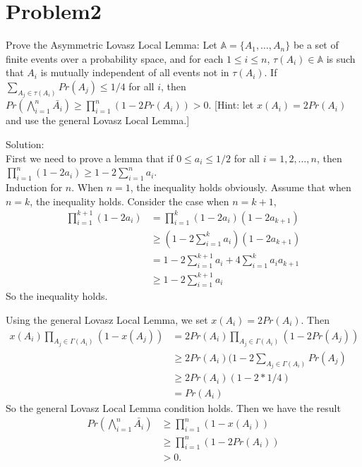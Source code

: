\documentclass[12pt]{article}
\begin{document}
\section{Problem2}
Prove the Asymmetric Lovasz Local Lemma: Let $\mathbb{A} = \{A_1, \dots, A_n\}$ be a set of finite events over a probability space, and for each $1 \le i \le n$, $\tau(A_i) \in \mathbb{A}$ is such that $A_i$ is mutually independent of all events not in $\tau(A_i)$. If $\sum_{A_j \in \tau(A_i)} Pr(A_j) \le 1/4 $ for all $i$, then $ Pr(\bigwedge_{i=1}^n \bar{A_i}) \ge \prod_{i=1}^n (1 - 2Pr(A_i))> 0$. [Hint: let $x(A_i) = 2Pr(A_i)$ and use the general Lovasz Local Lemma.]

Solution:\\
First we need to prove a lemma that if $0\le a_i \le 1/2$ for all $i=1,2,\dots,n$, then $\prod_{i=1}^n (1-2a_i) \ge 1-2\sum_{i=1}^n a_i$.\\
Induction for $n$. When $n=1$, the inequality holds obviously. Assume that when $n=k$, the inequality holds. Consider the case when $n=k+1$,
\begin{equation}
    \begin{split}
    \prod_{i=1}^{k+1}(1-2a_i) &= \prod_{i=1}^k (1-2a_i) (1-2a_{k+1}) \\
    &\ge (1-2\sum_{i=1}^k a_i)(1-2a_{k+1})\\
    &= 1-2\sum_{i=1}^{k+1} a_i + 4\sum_{i=1}^k a_i a_{k+1}\\
    &\ge 1-2\sum_{i=1}^{k+1} a_i
    \end{split}
\end{equation}
So the inequality holds.

Using the general Lovasz Local Lemma, we set $x(A_i) = 2Pr(A_i)$. Then
\begin{equation}
    \begin{split}
    x(A_i)\prod_{A_j\in \Gamma(A_i)}(1-x(A_j)) &= 2Pr(A_i)\prod_{A_j\in \Gamma(A_i)}(1-2Pr(A_j))\\
    &\ge 2Pr(A_i) (1-2\sum_{A_j\in \Gamma(A_i)}Pr(A_j)\\
    &\ge 2Pr(A_i) (1 - 2 * 1/4)\\
    &= Pr(A_i)
    \end{split}
\end{equation}
So the general Lovasz Local Lemma condition holds. Then we have the result
\begin{equation}
    \begin{split}
    Pr(\bigwedge_{i=1}^n \bar{A_i}) &\ge \prod_{i=1}^n (1 - x(A_i))\\
    &\ge \prod_{i=1}^n (1 - 2Pr(A_i))\\
    &> 0.
    \end{split}
\end{equation}
\end{document}

